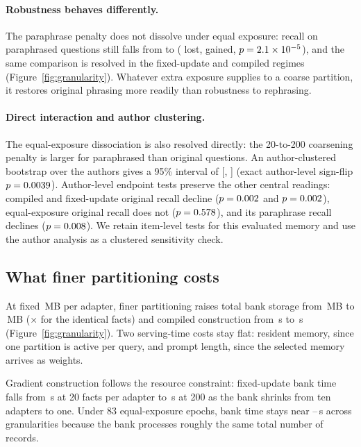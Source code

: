 \documentclass{article}
\begin{document}
\paragraph{Robustness behaves differently.} The paraphrase penalty does not
dissolve under equal exposure: recall on paraphrased questions still falls from
\ExpGTwentyPQ{} to \ExpGTwoHundredPQ{} (\ExpCurvePQLost{} lost,
\ExpCurvePQGained{} gained, $p=2.1\times10^{-5}{}$), and the same comparison is
resolved in the fixed-update and compiled regimes (Figure~\ref{fig:granularity}).
Whatever extra exposure supplies to a coarse partition, it restores original
phrasing more readily than robustness to rephrasing.

\paragraph{Direct interaction and author clustering.} The equal-exposure
dissociation is also resolved directly: the 20-to-200 coarsening penalty is
\ExpInteraction{} larger for paraphrased than original questions. An
author-clustered bootstrap over the \NAuthorClusters{} authors gives a 95\%
interval of [\ExpInteractionCILo{}, \ExpInteractionCIHi{}] (exact author-level
sign-flip $p=0.0039{}$). Author-level endpoint tests preserve the
other central readings: compiled and fixed-update original recall decline
($p=0.002{}$ and $p=0.002{}$), equal-exposure original recall
does not ($p=0.578{}$), and its paraphrase recall declines
($p=0.008{}$). We retain item-level tests for this evaluated memory and
use the author analysis as a clustered sensitivity check.

\subsection{What finer partitioning costs}
\label{sec:cost}

At fixed \ResidentMB{}\,MB per adapter, finer partitioning raises total bank
storage from \GTwoHundredTotMB{}\,MB to \GTwentyTotMB{}\,MB
(\StorageRatio{}$\times$ for the identical \NPerArm{} facts) and compiled
construction from \GTwoHundredBuild{}\,s to \GTwentyBuild{}\,s
(Figure~\ref{fig:granularity}). Two serving-time costs stay flat: resident memory,
since one partition is active per query, and prompt length, since the selected
memory arrives as weights.

Gradient construction follows the resource constraint: fixed-update bank time
falls from \SeedBuildTwenty{}\,s at 20 facts per adapter to
\SeedBuildTwoHundred{}\,s at 200 as the bank shrinks from ten adapters to one.
Under 83 equal-exposure epochs, bank time stays near
\ExpBuildHundred{}--\ExpBuildTwoHundred{}\,s across granularities because the
bank processes roughly the same total number of records.
\end{document}
